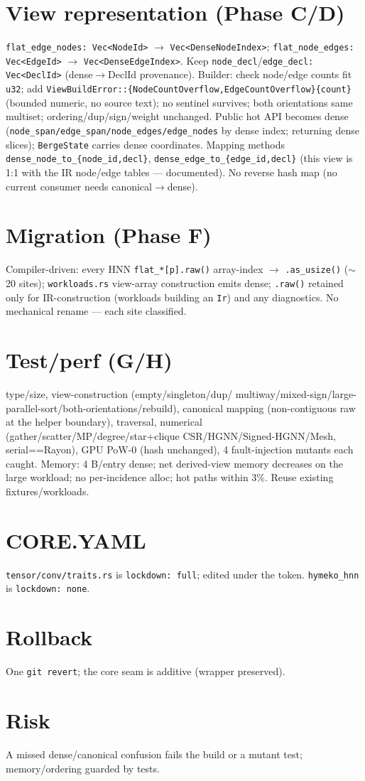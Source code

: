 \documentclass[11pt]{article}
\begin{document}
\section{View representation (Phase C/D)}
\texttt{flat\_edge\_nodes: Vec<NodeId>} $\to$ \texttt{Vec<DenseNodeIndex>};
\texttt{flat\_node\_edges: Vec<EdgeId>} $\to$ \texttt{Vec<DenseEdgeIndex>}. Keep
\texttt{node\_decl}/\texttt{edge\_decl: Vec<DeclId>} (dense$\to$DeclId provenance).
Builder: check node/edge counts fit \texttt{u32}; add
\texttt{ViewBuildError::\{NodeCountOverflow,EdgeCountOverflow\}\{count\}} (bounded
numeric, no source text); no sentinel survives; both orientations same multiset;
ordering/dup/sign/weight unchanged. Public hot API becomes dense
(\texttt{node\_span/edge\_span/node\_edges/edge\_nodes} by dense index; returning
dense slices); \texttt{BergeState} carries dense coordinates. Mapping methods
\texttt{dense\_node\_to\_\{node\_id,decl\}}, \texttt{dense\_edge\_to\_\{edge\_id,decl\}}
(this view is 1:1 with the IR node/edge tables --- documented). No reverse hash map
(no current consumer needs canonical$\to$dense).
\section{Migration (Phase F)} Compiler-driven: every HNN
\texttt{flat\_*[p].raw()} array-index $\to$ \texttt{.as\_usize()} ($\sim$20 sites);
\texttt{workloads.rs} view-array construction emits dense; \texttt{.raw()} retained
only for IR-construction (workloads building an \texttt{Ir}) and any diagnostics.
No mechanical rename --- each site classified.
\section{Test/perf (G/H)} type/size, view-construction (empty/singleton/dup/
multiway/mixed-sign/large-parallel-sort/both-orientations/rebuild), canonical
mapping (non-contiguous raw at the helper boundary), traversal, numerical
(gather/scatter/MP/degree/star+clique CSR/HGNN/Signed-HGNN/Mesh, serial==Rayon),
GPU PoW-0 (hash unchanged), 4 fault-injection mutants each caught. Memory: 4 B/entry
dense; net derived-view memory decreases on the large workload; no per-incidence
alloc; hot paths within 3\%. Reuse existing fixtures/workloads.
\section{CORE.YAML} \texttt{tensor/conv/traits.rs} is \texttt{lockdown: full};
edited under the token. \texttt{hymeko\_hnn} is \texttt{lockdown: none}.
\section{Rollback} One \texttt{git revert}; the core seam is additive (wrapper
preserved). \section{Risk} A missed dense/canonical confusion fails the build or a
mutant test; memory/ordering guarded by tests.
\end{document}
